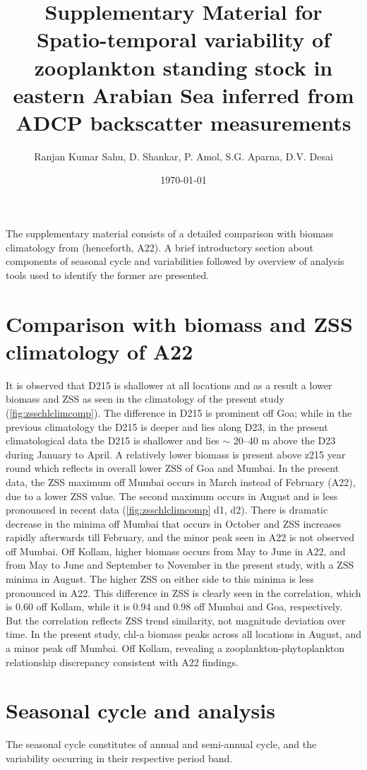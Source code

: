 \documentclass{article}
\title{\textbf{\large{Supplementary Material for}}\\ \LARGE{Spatio-temporal variability of zooplankton standing stock in eastern Arabian Sea inferred from ADCP backscatter measurements}}}
\author{Ranjan Kumar Sahu, D. Shankar, P. Amol, S.G. Aparna,  D.V. Desai }
\date{\today}
\begin{document}
	\maketitle
	\linenumbers
	\large
	The supplementary material consists of a detailed comparison with biomass climatology from \citep{aparna2022seasonal} (henceforth, A22). A brief introductory section about components of seasonal cycle and variabilities followed by overview of analysis tools used to identify the former are presented.
	
	\section{Comparison with biomass and ZSS climatology of A22}	 	
	It is observed that D215 is shallower at all locations and as a result a lower biomass and ZSS as seen in the climatology of the present study (\cref{fig:zsschlclimcomp}). The difference in D215 is prominent off Goa; while in the previous climatology  the D215 is deeper and lies along D23, in the present climatological data the D215 is shallower and lies $\sim$ 20--40 m above the D23 during January to April. A relatively lower biomass is present above z215 year round which reflects in overall lower ZSS of Goa and Mumbai. In the present data, the ZSS maximum off Mumbai occurs in March instead of February (A22), due to a lower ZSS value. The second maximum occurs in August and is less pronounced in recent data (\cref{fig:zsschlclimcomp} d1, d2). There is dramatic decrease in the minima off Mumbai that occurs in October and ZSS increases rapidly afterwards till February, and the minor peak seen in A22 is not observed off Mumbai. Off Kollam, higher biomass occurs from May to June in A22, and from May to June and September to November in the present study, with a ZSS minima in August. The higher ZSS on either side to this minima is less pronounced in A22. This difference in ZSS is clearly seen in the correlation, which is 0.60 off Kollam, while it is 0.94 and 0.98 off Mumbai and Goa, respectively. But the correlation reflects ZSS trend similarity, not magnitude deviation over time. In the present study, chl-a biomass peaks across all locations in August, and a minor peak off Mumbai. Off Kollam, revealing a zooplankton-phytoplankton relationship discrepancy consistent with A22 findings.

	\section{Seasonal cycle and analysis}
	\label{sec:seasonlity_analysis}
	The seasonal cycle constitutes of annual and semi-annual cycle, and the variability occurring in their respective period band. 
\end{document}
